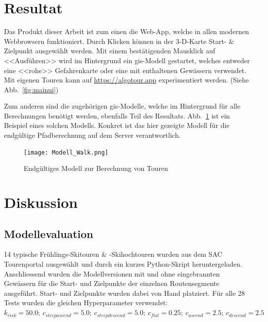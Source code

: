 \section{Resultat}

Das Produkt dieser Arbeit ist zum einen die Web-App, welche in allen modernen Webbrowsern funktioniert. Durch Klicken können in der 3-D-Karte Start- \& Zielpunkt ausgewählt werden. Mit einem bestätigenden Mausklick auf <<Ausführen>> wird im Hintergrund ein \gls{gis}-Modell gestartet, welches entweder eine <<rohe>> Gefahrenkarte oder eine mit enthaltenen Gewässern verwendet. Mit eigenen Touren kann auf \url{https://algotour.app} experimentiert werden. (Siehe Abb.\ \ref{fig:mainui})

Zum anderen sind die zugehörigen \acrshort{gis}-Modelle, welche im Hintergrund für alle Berechnungen benötigt werden, ebenfalls Teil des Resultats. Abb.\ \ref{fig:walkmodel} ist ein Beispiel eines solchen Modells. Konkret ist das hier gezeigte Modell für die endgültige Pfadberechnung auf dem Server verantwortlich.


\begin{figure}[H]
  \centering
  \texttt{[image: Modell\_Walk.png]}
  \caption{Endgültiges Modell zur Berechnung von Touren}\label{fig:walkmodel}
\end{figure}

\clearpage
\section{Diskussion}

\subsection{Modellevaluation}

14 typische Frühlings-Skitouren \& -Skihochtouren wurden aus dem SAC Tourenportal ausgewählt und durch ein kurzes Python-Skript heruntergeladen. Anschliessend wurden die Modellversionen mit und ohne eingebrannten Gewässern für die Start- und Zielpunkte der einzelnen Routensegmente ausgeführt. Start- und Zielpunkte wurden dabei von Hand platziert. Für alle 28 Tests wurden die gleichen Hyperparameter verwendet: \\$k_{risk}={50.0};\ c_{steepascend}={5.0};\ c_{steepdescend}={5.0};\ c_{flat}={0.25};\ c_{ascend}={2.5};\ c_{descend}={2.5}$

